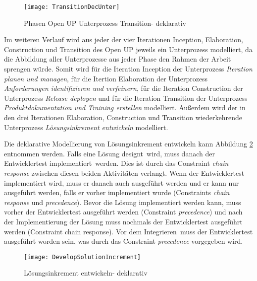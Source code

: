 \begin{figure}[htp]
\begin{center}
  \texttt{[image: TransitionDecUnter]} %
  \caption{Phasen Open UP Unterprozess Transition- deklarativ}
  \label{fig:TransitionDecUnter}
\end{center}
\end{figure}



Im weiteren Verlauf wird aus jeder der vier Iterationen Inception, Elaboration, Construction und Transition des Open UP jeweils ein Unterprozess modelliert, da die Abbildung aller Unterprozesse aus jeder Phase den Rahmen der Arbeit sprengen würde. \newline
Somit wird für die Iteration Inception der Unterprozess \textit{Iteration planen und managen}, für die Itertion Elaboration der Unterprozess \textit{Anforderungen identifizieren und verfeinern}, für die Iteration Construction der Unterprozess \textit{Release deployen} und für die Iteration Transition der Unterprozess \textit{Produktdokumentation und Training erstellen} modelliert. Außerdem wird der in den drei Iterationen Elaboration, Construction und Transition wiederkehrende Unterprozess \textit{Lösungsinkrement entwickeln} modelliert.


Die deklarative Modellierung von Lösungsinkrement entwickeln kann Abbildung \ref{fig:Develop} entnommen werden.\newline
Falls eine \grqq Lösung designt\grqq \ wird, muss danach der \grqq Entwicklertest implementiert\grqq \ werden. Dies ist durch das Constraint \textit{chain response} zwischen diesen beiden Aktivitäten verlangt. Wenn der Entwicklertest implementiert wird, muss er danach auch ausgeführt werden und er kann nur ausgeführt werden, falls er vorher implementiert wurde (Constraints \textit{chain response} und \textit{precedence}).\newline
Bevor die Lösung implementiert werden kann, muss vorher der Entwicklertest ausgeführt werden (Constraint \textit{precedence}) und nach der Implementierung der Lösung muss nochmals der Entwicklertest ausgeführt werden (Constraint chain response).\newline
Vor dem \grqq Integrieren\grqq \ muss der Entwicklertest ausgeführt worden sein, was durch das Constraint \textit{precedence} vorgegeben wird.
\begin{figure}[htp]
\begin{center}
  \texttt{[image: DevelopSolutionIncrement]} %
  \caption{Lösungsinkrement entwickeln- deklarativ}
  \label{fig:Develop}
\end{center}
\end{figure}

